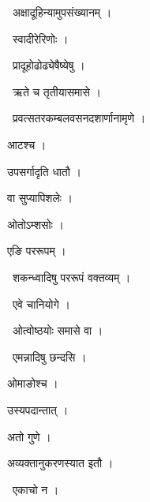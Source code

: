 \documentclass[10pt, openany, oneside]{book}
\begin{document}
\par\noindent\hspace{1.5em}{\vps वा॰}~{\qt अक्षादूहिन्यामुपसंख्यानम् ।}

\par\noindent\hspace{1.5em}{\vps वा॰}~{\qt स्वादीरेरिणोः ।}

\par\noindent\hspace{1.5em}{\vps वा॰}~{\qt प्रादूहोढोढ्येषैष्येषु ।}

\par\noindent\hspace{1.5em}{\vps वा॰}~{\qt ऋते च तृतीयासमासे ।}

\par\noindent\hspace{1.5em}{\vps वा॰}~{\qt प्रवत्सतरकम्बलवसनदशार्णानामृणे ।}

\noindent आटश्च ।

\noindent उपसर्गादृति धातौ ।

\noindent वा सुप्यापिशलेः ।

\noindent ओतोऽम्शसोः ।

\noindent एङि पररूपम् ।

\par\noindent\hspace{1.5em}{\vps वा॰}~{\qt शकन्ध्वादिषु पररूपं वक्तव्यम् ।}

\par\noindent\hspace{1.5em}{\vps वा॰}~{\qt एवे चानियोगे ।}

\par\noindent\hspace{1.5em}{\vps वा॰}~{\qt ओत्वोष्ठयोः समासे वा ।}

\par\noindent\hspace{1.5em}{\vps वा॰}~{\qt एमन्नादिषु छन्दसि ।}

\noindent ओमाङोश्च ।

\noindent उस्यपदान्तात् ।

\noindent अतो गुणे ।

\noindent अव्यक्तानुकरणस्यात इतौ ।

\par\noindent\hspace{1.5em}{\vps वा॰}~{\qt एकाचो न ।}
\end{document}
